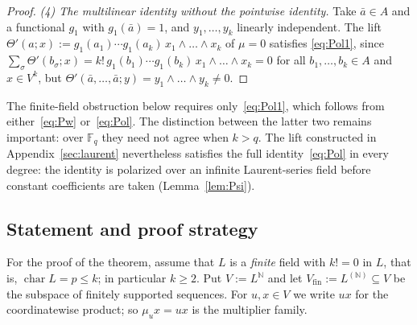 \documentclass[11pt]{amsart}
\theoremstyle{definition}
\theoremstyle{remark}
\numberwithin{equation}{section}
\newcommand{\N}{\mathbb N}
\newcommand{\F}{\mathbb F}
\theoremstyle{plain}
\theoremstyle{definition}
\theoremstyle{plain}
\begin{document}
\begin{proof}
\emph{(4) The multilinear identity without the pointwise identity.} Take $\bar a\in A$ and a functional $g_1$ with $g_1(\bar a)=1$, and $y_1,\dots,y_k$ linearly independent. The
lift $\Theta'(a;x):=g_1(a_1)\cdots g_1(a_k)\,x_1\wedge\dots\wedge x_k$ of $\mu=0$ satisfies \eqref{eq:Pol1}, since
$\sum_\sigma\Theta'(b_\sigma;x)=k!\,g_1(b_1)\cdots g_1(b_k)\,x_1\wedge\dots\wedge x_k=0$ for all
$b_1,\dots,b_k\in A$ and $x\in V^k$, but $\Theta'(\bar a,\dots,\bar a;y)=y_1\wedge\dots\wedge y_k\neq0$.
\end{proof}

The finite-field obstruction below requires only~\eqref{eq:Pol1}, which follows from either~\eqref{eq:Pw}
or~\eqref{eq:Pol}. The distinction between the latter two remains important: over $\F_q$ they need not agree when
$k>q$. The lift constructed in Appendix~\ref{sec:laurent} nevertheless satisfies the full identity~\eqref{eq:Pol} in every
degree: the identity is polarized over an infinite Laurent-series field before constant coefficients are taken
(Lemma~\ref{lem:Psi}).

\subsection{Statement and proof strategy}
For the proof of the theorem, assume that $L$ is a \emph{finite} field with $k!=0$ in $L$, that is, $\operatorname{char}L=p\le k$; in
particular $k\ge2$. Put $V:=L^\N$ and let $V_{\mathrm{fin}}:=L^{(\N)}\subseteq V$ be the subspace of finitely supported
sequences. For $u,x\in V$ we write $ux$ for the coordinatewise product; so $\mu_ux=ux$ is the multiplier family.
\end{document}

